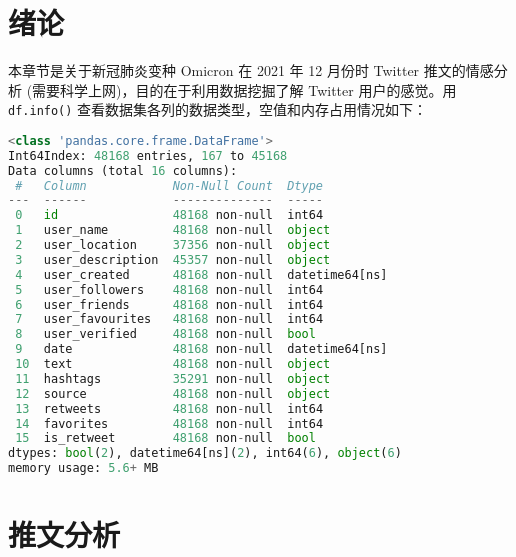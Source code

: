 \documentclass[12pt,AutoFakeBold]{article}
\begin{document}
\maketitle
\setcounter{tocdepth}{2}

\tableofcontents  %

\makeatletter
\begin{center}
    \LARGE \textbf{\textsf{\@problem}}
\end{center}
\makeatother


\section{绪论}

本章节是关于新冠肺炎变种 Omicron 在 2021 年 12 月份时 Twitter 推文的情感分析 (需要科学上网)，目的在于利用数据挖掘了解 Twitter 用户的感觉。用 \lstinline[language=Python]|df.info()| 查看数据集各列的数据类型，空值和内存占用情况如下：


\begin{lstlisting}[language=Python]
<class 'pandas.core.frame.DataFrame'>
Int64Index: 48168 entries, 167 to 45168
Data columns (total 16 columns):
 #   Column            Non-Null Count  Dtype         
---  ------            --------------  -----         
 0   id                48168 non-null  int64         
 1   user_name         48168 non-null  object        
 2   user_location     37356 non-null  object        
 3   user_description  45357 non-null  object        
 4   user_created      48168 non-null  datetime64[ns]
 5   user_followers    48168 non-null  int64         
 6   user_friends      48168 non-null  int64         
 7   user_favourites   48168 non-null  int64         
 8   user_verified     48168 non-null  bool          
 9   date              48168 non-null  datetime64[ns]
 10  text              48168 non-null  object        
 11  hashtags          35291 non-null  object        
 12  source            48168 non-null  object        
 13  retweets          48168 non-null  int64         
 14  favorites         48168 non-null  int64         
 15  is_retweet        48168 non-null  bool          
dtypes: bool(2), datetime64[ns](2), int64(6), object(6)
memory usage: 5.6+ MB
\end{lstlisting}

\section{推文分析}
\end{document}
